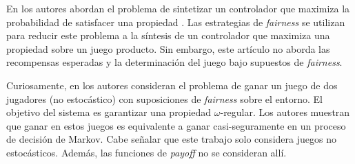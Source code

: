 En \cite{DBLP:conf/ifipTCS/BolligC04} los autores abordan el problema de sintetizar un controlador que maximiza la probabilidad de satisfacer una propiedad {\LTL}. Las estrategias de \textit{fairness} se utilizan para reducir este problema a la síntesis de un controlador que maximiza una propiedad {\PCTL} sobre un juego producto. Sin embargo, este artículo no aborda las recompensas esperadas y la determinación del juego bajo supuestos de \textit{fairness}.

Curiosamente, en \cite{DBLP:conf/fossacs/AsarinCV10} los autores consideran el problema de ganar un juego de dos jugadores (no estocástico) con suposiciones de \textit{fairness} sobre el entorno. El objetivo del sistema es garantizar una propiedad $\omega$-regular. Los autores muestran que ganar en estos juegos es equivalente a ganar casi-seguramente en un proceso de decisión de Markov. Cabe señalar que este trabajo solo considera juegos no estocásticos. Además, las funciones de \textit{payoff} no se consideran allí.


